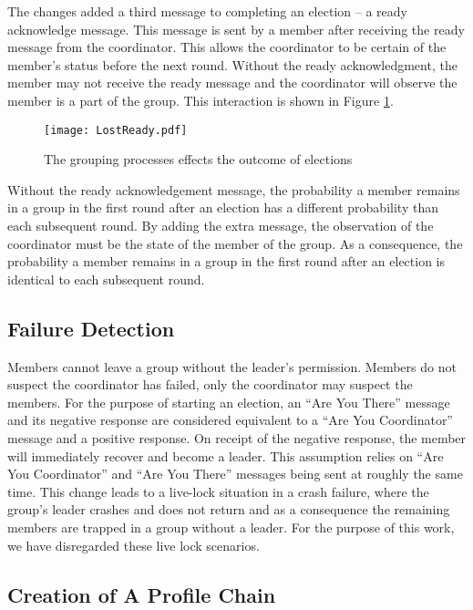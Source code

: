 The changes added a third message to completing an election -- a ready acknowledge message.
This message is sent by a member after receiving the ready message from the coordinator.
This allows the coordinator to be certain of the member's status before the next round.
Without the ready acknowledgment, the member may not receive the ready message and the coordinator will observe the member is a part of the group.
This interaction is shown in Figure \ref{fig:lostready}.

\begin{figure}
\texttt{[image: LostReady.pdf]}
\caption{The grouping processes effects the outcome of elections} \label{fig:lostready}
\end{figure}

Without the ready acknowledgement message, the probability a member remains in a group in the first round after an election has a different probability than each subsequent round.
By adding the extra message, the observation of the coordinator must be the state of the member of the group.
As a consequence, the probability a member remains in a group in the first round after an election is identical to each subsequent round.

\subsection{Failure Detection}

Members cannot leave a group without the leader's permission.
Members do not suspect the coordinator has failed, only the coordinator may suspect the members.
For the purpose of starting an election, an ``Are You There'' message and its negative response are considered equivalent to a ``Are You Coordinator'' message and a positive response.
On receipt of the negative response, the member will immediately recover and become a leader.
This assumption relies on ``Are You Coordinator'' and ``Are You There'' messages being sent at roughly the same time.
This change leads to a live-lock situation in a crash failure, where the group's leader crashes and does not return and as a consequence the remaining members are trapped in a group without a leader.
For the purpose of this work, we have disregarded these live lock scenarios.


\subsection{Creation of A Profile Chain}

